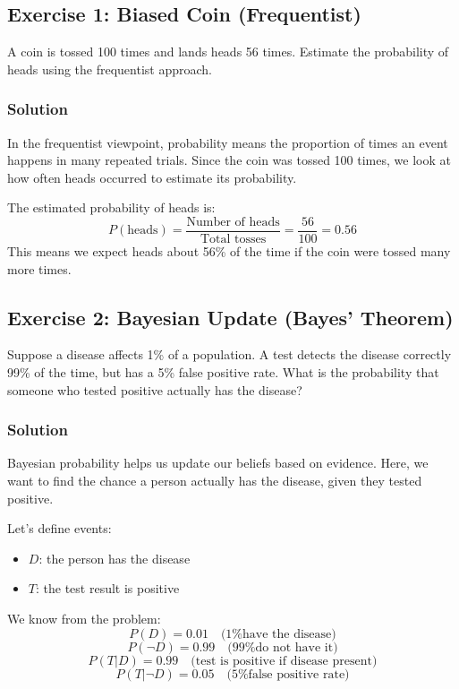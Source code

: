 \documentclass{book}
\begin{document}
\subsection*{Exercise 1: Biased Coin (Frequentist)}
A coin is tossed 100 times and lands heads 56 times. Estimate the probability of heads using the frequentist approach.

\subsubsection*{Solution}
In the frequentist viewpoint, probability means the proportion of times an event happens in many repeated trials. Since the coin was tossed 100 times, we look at how often heads occurred to estimate its probability.

The estimated probability of heads is:
\[
P(\text{heads}) = \frac{\text{Number of heads}}{\text{Total tosses}} = \frac{56}{100} = 0.56
\]
This means we expect heads about 56\% of the time if the coin were tossed many more times.

\subsection*{Exercise 2: Bayesian Update (Bayes' Theorem)}
Suppose a disease affects 1\% of a population. A test detects the disease correctly 99\% of the time, but has a 5\% false positive rate. What is the probability that someone who tested positive actually has the disease?

\subsubsection*{Solution}
Bayesian probability helps us update our beliefs based on evidence. Here, we want to find the chance a person actually has the disease, given they tested positive.

Let's define events:
\begin{itemize}
    \item $D$: the person has the disease
    \item $T$: the test result is positive
\end{itemize}

We know from the problem:
\[
P(D) = 0.01 \quad\text{(1\% have the disease)}
\]
\[
P(\neg D) = 0.99 \quad\text{(99\% do not have it)}
\]
\[
P(T | D) = 0.99 \quad\text{(test is positive if disease present)}
\]
\[
P(T | \neg D) = 0.05 \quad\text{(5\% false positive rate)}
\]
\end{document}
